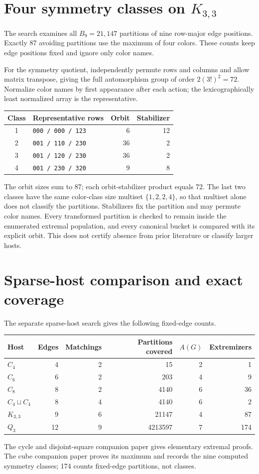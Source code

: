 \documentclass[11pt,letterpaper]{article}
\begin{document}
\section{Four symmetry classes on \texorpdfstring{$K_{3,3}$}{K3,3}}
The search examines all $B_9=21{,}147$ partitions of nine row-major edge
positions. Exactly 87 avoiding partitions use the maximum of four colors.
These counts keep edge positions fixed and ignore only color names.

For the symmetry quotient, independently permute rows and columns and allow
matrix transpose, giving the full automorphism group of order
$2(3!)^2=72$. Normalize color names by first appearance after each action;
the lexicographically least normalized array is the representative.
\begin{center}\small
\begin{tabular}{clrr}
\toprule
Class & Representative rows & Orbit & Stabilizer\\
\midrule
1 & \texttt{000 / 000 / 123} & 6 & 12\\
2 & \texttt{001 / 110 / 230} & 36 & 2\\
3 & \texttt{001 / 120 / 230} & 36 & 2\\
4 & \texttt{001 / 230 / 320} & 9 & 8\\
\bottomrule
\end{tabular}
\end{center}
The orbit sizes sum to 87; each orbit-stabilizer product equals 72. The last
two classes have the same color-class size multiset $\{1,2,2,4\}$, so that
multiset alone does not classify the partitions. Stabilizers fix the partition
and may permute color names. Every transformed partition is checked to remain
inside the enumerated extremal population, and every canonical bucket is
compared with its explicit orbit. This does not certify absence from prior
literature or classify larger hosts.

\newpage
\section{Sparse-host comparison and exact coverage}
The separate sparse-host search gives the following fixed-edge counts.
\begin{center}\small
\begin{tabular}{lrrrrr}
\toprule
Host & Edges & Matchings & Partitions covered & $A(G)$ & Extremizers\\
\midrule
$C_4$ & 4 & 2 & 15 & 2 & 1\\
$C_6$ & 6 & 2 & 203 & 4 & 9\\
$C_8$ & 8 & 2 & 4140 & 6 & 36\\
$C_4\sqcup C_4$ & 8 & 4 & 4140 & 6 & 2\\
$K_{3,3}$ & 9 & 6 & 21147 & 4 & 87\\
$Q_3$ & 12 & 9 & 4213597 & 7 & 174\\
\bottomrule
\end{tabular}
\end{center}
The cycle and disjoint-square companion paper gives elementary extremal
proofs. The cube companion paper proves its maximum and records the nine
computed symmetry classes; 174 counts fixed-edge partitions, not classes.
\end{document}
